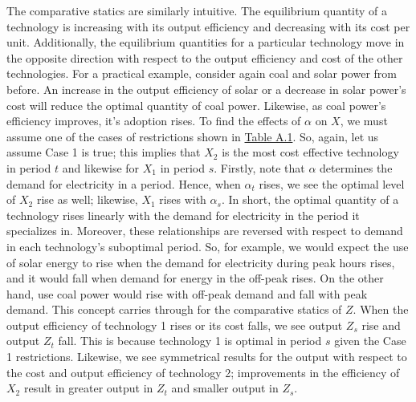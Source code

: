 \documentclass[11pt,a4paper,leqno]{extarticle}
\begin{document}
	
	The comparative statics are similarly intuitive. The equilibrium quantity of a technology is increasing with its output efficiency and decreasing with its cost per unit. Additionally, the equilibrium quantities for a particular technology move in the opposite direction with respect to the output efficiency and cost of the other technologies. For a practical example, consider again coal and solar power from before. An increase in the output efficiency of solar or a decrease in solar power's cost will reduce the optimal quantity of coal power. Likewise, as coal power's efficiency improves, it's adoption rises. To find the effects of $\alpha$ on $X$, we must assume one of the cases of restrictions shown in \hyperref[tab:paramrest]{Table A.1}. So, again, let us assume Case 1 is true; this implies that $X_2$ is the most cost effective technology in period $t$ and likewise for $X_1$ in period $s$. Firstly, note that $\alpha$ determines the demand for electricity in a period. Hence, when $\alpha_t$ rises, we see the optimal level of $X_2$ rise as well; likewise, $X_1$ rises with $\alpha_s$. In short, the optimal quantity of a technology rises linearly with the demand for electricity in the period it specializes in. Moreover, these relationships are reversed with respect to demand in each technology's suboptimal period. So, for example, we would expect the use of solar energy to rise when the demand for electricity during peak hours rises, and it would fall when demand for energy in the off-peak rises. On the other hand, use coal power would rise with off-peak demand and fall with peak demand. This concept carries through for the comparative statics of $Z$. When the output efficiency of technology 1 rises or its cost falls, we see output $Z_s$ rise and output $Z_t$ fall. This is because technology 1 is optimal in period $s$ given the Case 1 restrictions. Likewise, we see symmetrical results for the output with respect to the cost and output efficiency of technology 2; improvements in the efficiency of $X_2$ result in greater output in $Z_t$ and smaller output in $Z_s$.  
	
\end{document}
